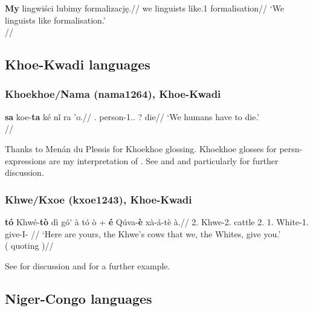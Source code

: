 \ex \begingl
\gla \textbf{My} lingwiści lubimy formalizację.//
\glb we linguists like.1\Pl{} formalisation//
\glft `We linguists like formalisation.'\\\citep[161f., (3b)]{rutkowski2002}//
\endgl
\xe


\subsection{Khoe-Kwadi languages}

\subsubsection{Khoekhoe/Nama (nama1264), Khoe-Kwadi}


\ex \begingl
\gla \textbf{sa} koe-\textbf{ta} ké n\~{i} ra \textdoublepipe{}'o.//
\glb \Art{}.\Addr{} person-1\Pl{}.\Incl{}.\Common{} \Top{}? \Compel{} \Prog{} die//
\glft `We humans have to die.' \\{\citep[after][133, (27b)]{boehm1985}}//
\endgl
\xe

Thanks to Menán du Plessis for Khoekhoe glossing. Khoekhoe glosses for \gls{persn}-expressions are my interpretation of \citet{haacke1977}.
See \citet[133--145]{boehm1985} and \citet[140]{maho1998} and particularly \citet{haacke1976, haacke1977, haacke2013namamorph} for further discussion. 

\subsubsection{Khwe/Kxoe (kxoe1243), Khoe-Kwadi}

\ex
\begingl
{} \textbf{tó} Khwé-\textbf{tò} dì gó\'{\textepsilon} à tó ò + \textbf{\textdoublepipe{}é} Qúva-\textbf{\textdoublepipe{}è} \textdoublebarpipe{}xà-á-tè à.//
\glb \Dem{} 2\Pl{}.\Common{} Khwe-2\Pl{}.\Common{} \Poss{} cattle \Obj{} 2\Pl{}.\Common{} \Poss{} 1\Pl{}.\M{} White-1\Pl{}.\M{} give-I-\Prs{} \Obj{}//
\glft `Here are yours, the Khwe's cows that we, the Whites, give you.' \\{(\citealp[41, (1)]{kilianhatz2008} quoting \citealp[514f.]{koehler1989})}//
\endgl
\xe

See \citet[ch. 3.1.2]{kilianhatz2008} for discussion and \citet[79]{kilianhatz2008} for a further example.

\subsection{Niger-Congo languages}


